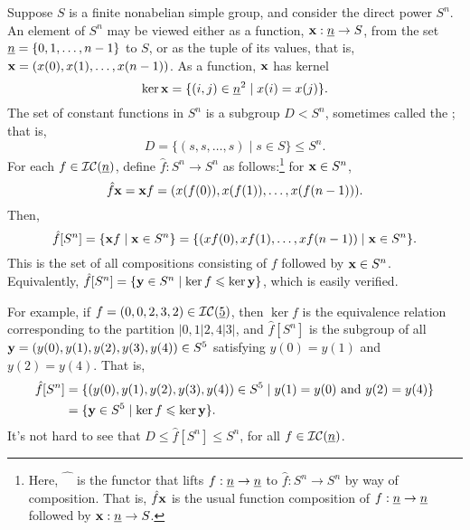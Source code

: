 Suppose $S$ is a finite nonabelian simple group, and consider the direct power $S^n$.
An element of $S^n$ may be viewed either as a function, $\mathbf{x} : \underline{n} \to S$,
from the set $\underline{n} = \{0, 1, \dots, n-1\}$ to $S$, or as the tuple 
of its values, that is,
%
%
    $\mathbf{x} = (x(0), x(1), \dots, x(n-1))$.
%
As a function, $\mathbf{x}$ has kernel
\[
\ker \mathbf{x} = \{(i,j) \in \underline{n}^2 \mid x(i) = x(j)\}.
\]
The set of constant functions in $S^n$ is a subgroup $D < S^n$, sometimes called the
; that is,
\[
D = \{(s, s, \dots, s) \mid s\in S\} \leq S^n.
\]
For each $f \in \mathcal{IC}(\underline{n})$, define $\hat{f}: S^n \to S^n$ as follows:\footnote{Here,
  $\widehat{\phantom{X}}$ is the functor that lifts $f: \underline{n} \to \underline{n}$ to
  $\hat{f} : S^n \to S^n$ by way of composition. That is, $\hat{f}\mathbf{x}$ is
  the usual function composition of $f: \underline{n} \to \underline{n}$ followed by $\mathbf{x}: \underline{n} \to S$.}
for $\mathbf{x} \in S^n$,
\[
\hat{f}\mathbf{x} = \mathbf{x} f
= (x(f(0)), x(f(1)), \dots, x(f(n-1))).
\]
Then, 
\[
\hat{f}[S^n] = \{\mathbf{x} f \mid \mathbf{x} \in S^n\} =
\{(xf(0), xf(1), \dots, xf(n-1)) \mid \mathbf{x} \in S^n\}.
\]
This is the set of all compositions consisting of
$f$ followed by $\mathbf{x}\in S^n$.
Equivalently, $\hat{f}[S^n] = \{ \mathbf{y}\in S^n \mid \ker f \leqslant \ker \mathbf{y} \}$,
which is easily verified.

For example, 
if $f = (0, 0, 2, 3, 2)\in \mathcal{IC}(\underline{5})$, then 
$\ker f$ is the equivalence relation corresponding to
the partition $|0,1|2,4|3|$, and 
$\hat{f}[S^n]$ is the subgroup of all
$\mathbf{y} = (y(0), y(1), y(2), y(3), y(4))\in S^5$ satisfying $y(0) = y(1)$ and
$y(2) = y(4)$. That is,
\begin{align*}
\hat{f}[S^n] &= \{(y(0), y(1), y(2), y(3), y(4)) \in S^5 \mid y(1) = y(0) \text{ and } y(2) = y(4)\}\\
&=\{\mathbf{y}\in S^5 \mid \ker f \leqslant \ker \mathbf{y}\}.
\end{align*}
It's not hard to see that $D \leq \hat{f}[S^n] \leq S^n$, for all $f\in \mathcal{IC}(\underline{n})$.

